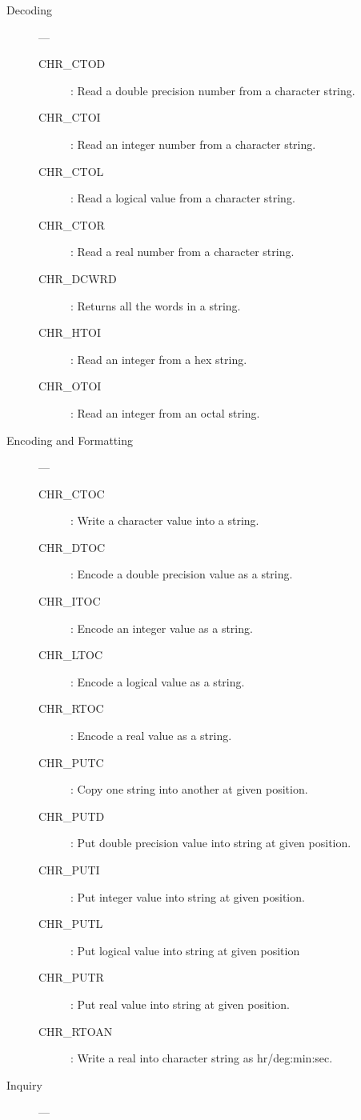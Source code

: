 \begin{description}

\item [Decoding] ---

\begin{description}
\item [CHR\_CTOD] : Read a double precision number from a character string.
\item [CHR\_CTOI] : Read an integer number from a character string.
\item [CHR\_CTOL] : Read a logical value from a character string.
\item [CHR\_CTOR] : Read a real number from a character string.
\item [CHR\_DCWRD] : Returns all the words in a string.
\item [CHR\_HTOI] : Read an integer from a hex string.
\item [CHR\_OTOI] : Read an integer from an octal string.
\end{description}

\item [Encoding and Formatting] ---

\begin{description}
\item [CHR\_CTOC] : Write a character value into a string.
\item [CHR\_DTOC] : Encode a double precision value as a string.
\item [CHR\_ITOC] : Encode an integer value as a string.
\item [CHR\_LTOC] : Encode a logical value as a string.
\item [CHR\_RTOC] : Encode a real value as a string.
\item [CHR\_PUTC] : Copy one string into another at given position.
\item [CHR\_PUTD] : Put double precision value into string at given position.
\item [CHR\_PUTI] : Put integer value into string at given position.
\item [CHR\_PUTL] : Put logical value into string at given position
\item [CHR\_PUTR] : Put real value into string at given position.
\item [CHR\_RTOAN] : Write a real into character string as hr/deg:min:sec.
\end{description}

\item [Inquiry] ---


\end{description}
